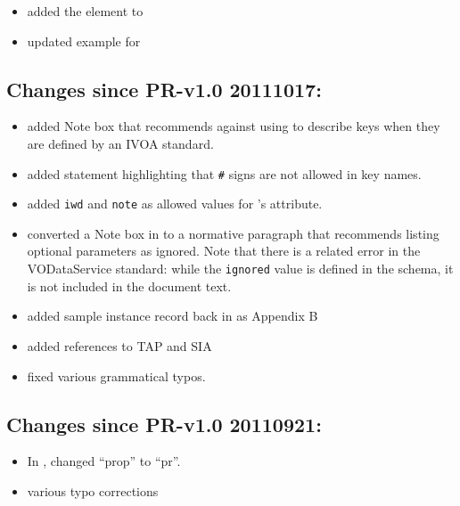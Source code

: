 \documentclass[11pt,a4paper]{ivoa}
\begin{document}
\begin{itemize}
\item  added the  element to

\item  updated example for 

\end{itemize}

\subsection{Changes since PR-v1.0 20111017:}

\begin{itemize}
\item  added Note box that recommends against using 
        to
       describe keys when they are defined by an IVOA standard.

\item  added statement highlighting that \verb|#| signs are
       not allowed in key names.

\item  added \texttt{iwd} and \texttt{note} as allowed values
       for 's
        attribute.

\item  converted a Note box in to a normative paragraph
       that recommends listing optional 
       parameters as ignored.  Note that there is a related error in
       the VODataService standard: while
       the \texttt{ignored} value is defined in
       the schema, it is not included in the document text.

\item  added sample 
       instance record back in as Appendix B

\item  added references to TAP and SIA

\item  fixed various grammatical typos.

\end{itemize}

\subsection{Changes since PR-v1.0 20110921:}

\begin{itemize}

\item  In , changed ``prop'' to ``pr''.

\item  various typo corrections

\end{itemize}
\end{document}
